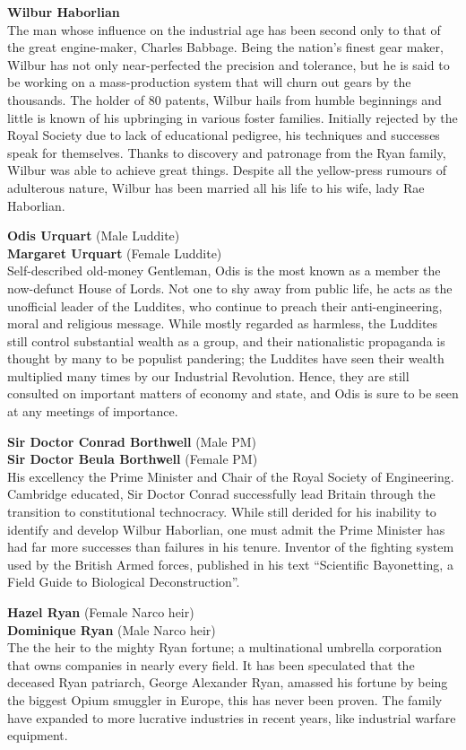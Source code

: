 \textbf{Wilbur Haborlian}\\
The man whose influence on the industrial age has been second only to
that of the great engine-maker, Charles Babbage. Being the nation's
finest gear maker, Wilbur has not only near-perfected the precision and
tolerance, but he is said to be working on a mass-production system that
will churn out gears by the thousands. The holder of 80 patents, Wilbur
hails from humble beginnings and little is known of his upbringing in
various foster families. Initially rejected by the Royal Society due to
lack of educational pedigree, his techniques and successes speak for
themselves. Thanks to discovery and patronage from the Ryan family,
Wilbur was able to achieve great things. Despite all the yellow-press
rumours of adulterous nature, Wilbur has been married all his life to
his wife, lady Rae Haborlian.

\textbf{Odis Urquart} (Male Luddite)\\
\textbf{Margaret Urquart} (Female Luddite)\\
Self-described old-money Gentleman, Odis is the most known as a member
the now-defunct House of Lords. Not one to shy away from public life, he
acts as the unofficial leader of the Luddites, who continue to preach
their anti-engineering, moral and religious message. While mostly
regarded as harmless, the Luddites still control substantial wealth as a
group, and their nationalistic propaganda is thought by many to be
populist pandering; the Luddites have seen their wealth multiplied many
times by our Industrial Revolution. Hence, they are still consulted on
important matters of economy and state, and Odis is sure to be seen at
any meetings of importance.

\textbf{Sir Doctor Conrad Borthwell} (Male PM)\\
\textbf{Sir Doctor Beula Borthwell} (Female PM)\\
His excellency the Prime Minister and Chair of the Royal Society of
Engineering. Cambridge educated, Sir Doctor Conrad successfully lead
Britain through the transition to constitutional technocracy. While
still derided for his inability to identify and develop Wilbur
Haborlian, one must admit the Prime Minister has had far more successes
than failures in his tenure. Inventor of the fighting system used by the
British Armed forces, published in his text ``Scientific Bayonetting, a
Field Guide to Biological Deconstruction''.

\textbf{Hazel Ryan} (Female Narco heir)\\
\textbf{Dominique Ryan} (Male Narco heir)\\
The the heir to the mighty Ryan fortune; a multinational umbrella
corporation that owns companies in nearly every field. It has been
speculated that the deceased Ryan patriarch, George Alexander Ryan,
amassed his fortune by being the biggest Opium smuggler in Europe, this
has never been proven. The family have expanded to more lucrative
industries in recent years, like industrial warfare equipment.

